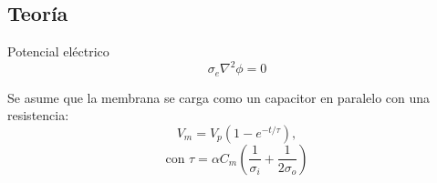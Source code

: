 \documentclass[a0,portrait]{a0poster}
\begin{document}
\begin{multicols}{2}
%
%

\color{DarkSlateGray} %

\section*{Teoría}

Potencial eléctrico
			\begin{equation}
				\sigma_{e} \nabla^2 \phi = 0
			\end{equation}

			

			Se asume que la membrana se carga como un capacitor en paralelo con una resistencia:
			\begin{equation}
				V_m = V_p (1 - e^{-t/\tau}),
			\end{equation}
			\begin{equation}
				\textrm{con } \tau = \alpha C_m \left( \frac{1}{\sigma_i} + \frac{1}{2 \sigma_o} \right)
			\end{equation}\\
			

\end{multicols}
\end{document}
